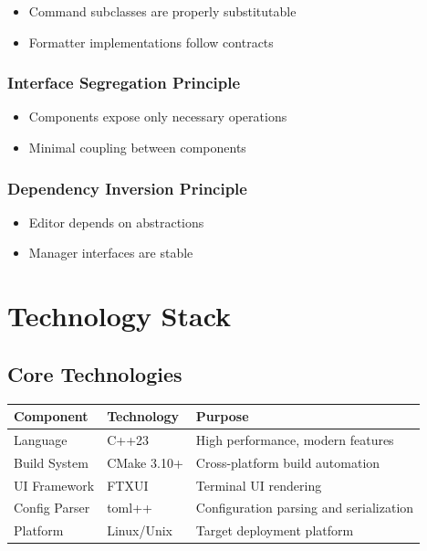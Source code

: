 \documentclass[12pt,a4paper,oneside,openany]{report}
\begin{document}
\begin{itemize}
	\item Command subclasses are properly substitutable
	\item Formatter implementations follow contracts
\end{itemize}

\subsection{Interface Segregation Principle}

\begin{itemize}
	\item Components expose only necessary operations
	\item Minimal coupling between components
\end{itemize}

\subsection{Dependency Inversion Principle}

\begin{itemize}
	\item Editor depends on abstractions
	\item Manager interfaces are stable
\end{itemize}

\chapter{Technology Stack}

\section{Core Technologies}

\begin{table}[H]
	\centering
	\begin{tabular}{|l|l|l|}
		\hline
		\textbf{Component} & \textbf{Technology} & \textbf{Purpose}                  \\
		\hline
		Language           & C++23               & High performance, modern features \\
		\hline
		Build System       & CMake 3.10+         & Cross-platform build automation   \\
		\hline
		UI Framework       & FTXUI               & Terminal UI rendering             \\
		\hline
		Config Parser      & toml++              & Configuration parsing and serialization\\
		\hline
		Platform           & Linux/Unix          & Target deployment platform        \\
		\hline
	\end{tabular}
\end{table}
\end{document}
